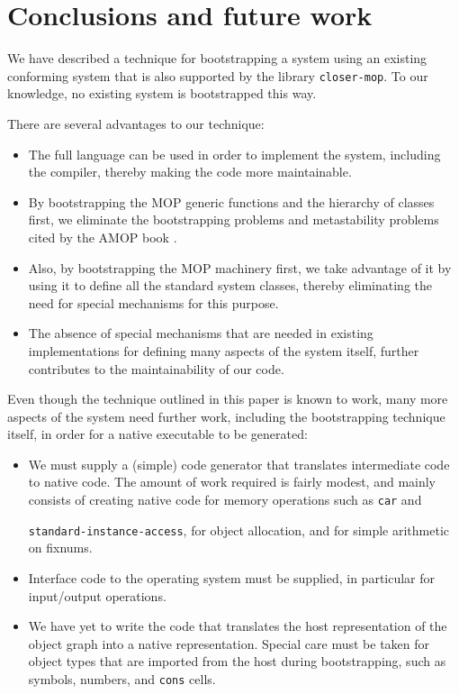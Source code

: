 \section{Conclusions and future work}

We have described a technique for bootstrapping a \commonlisp{} system
using an existing conforming \commonlisp{} system that is also
supported by the library \texttt{closer-mop}.  To our knowledge, no
existing \commonlisp{} system is bootstrapped this way.

There are several advantages to our technique:

\begin{itemize}
\item The full \commonlisp{} language can be used in order to
  implement the system, including the compiler, thereby making the
  code more maintainable.
\item By bootstrapping the MOP generic functions and the hierarchy of
  classes first, we eliminate the bootstrapping problems and
  metastability problems cited by the AMOP book
  \cite{Kiczales:1991:AMP:574212}.
\item Also, by bootstrapping the MOP machinery first, we take advantage
  of it by using it to define all the standard system classes, thereby
  eliminating the need for special mechanisms for this purpose.
\item The absence of special mechanisms that are needed in existing
  implementations for defining many aspects of the system itself,
  further contributes to the maintainability of our code.
\end{itemize}

Even though the technique outlined in this paper is known to work,
many more aspects of the system need further work, including the
bootstrapping technique itself, in order for a native executable to be
generated:

\begin{itemize}
\item We must supply a (simple) code generator that translates
  intermediate code to native code.  The amount of work required is
  fairly modest, and mainly consists of creating native code for
  memory operations such as \texttt{car} and

  \texttt{standard-instance-access}, for object allocation, and for
  simple arithmetic on fixnums.
\item Interface code to the operating system must be supplied, in
  particular for input/output operations.
\item We have yet to write the code that translates the host
  representation of the object graph into a native representation.
  Special care must be taken for object types that are imported from
  the host during bootstrapping, such as symbols, numbers, and
  \texttt{cons} cells.
\end{itemize}

